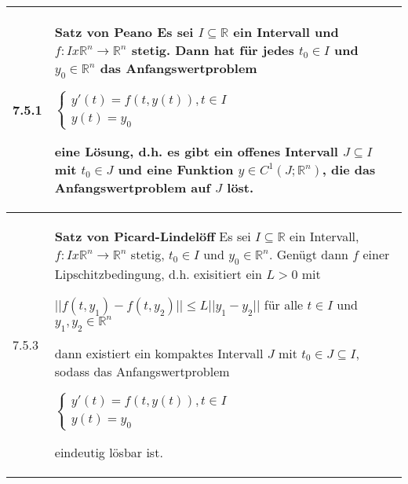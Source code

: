     \begin{longtable}{p{1cm} p{16cm}}
        \toprule

        7.5.1 & \textbf{Satz von Peano} \hfill \break
                Es sei $I \subseteq \mathbb{R}$ ein Intervall und $f: I x \mathbb{R}^n \rightarrow \mathbb{R}^n$ stetig. Dann hat
                für jedes $t_0 \in I$ und $y_0 \in \mathbb{R}^n$ das Anfangswertproblem \hfill \break
                \centerline{$   \begin{cases}
                                y'(t) = f(t,y(t)), t\in I \\
                                y(t) = y_0 
                                \end{cases} $} 
                eine Lösung, d.h. es gibt ein offenes Intervall $J \subseteq I$ mit $t_0 \in J$ und eine Funktion $y \in C^1(J;\mathbb{R}^n)$, 
                die das Anfangswertproblem auf $J$ löst. \\
        \midrule
        7.5.3 & \textbf{Satz von Picard-Lindelöff} \hfill \break
                Es sei $I \subseteq \mathbb{R}$ ein Intervall, $f: I x \mathbb{R}^n \rightarrow \mathbb{R}^n$ stetig, $t_0 \in I$ und 
                $y_0 \in \mathbb{R}^n$. Genügt dann $f$ einer Lipschitzbedingung, d.h. exisitiert ein $L > 0$ mit \hfill \break
                \centerline{$ ||f(t,y_1) -f(t,y_2)|| \leq L||y_1 - y_2||$ für alle $t\in I$ und $y_1,y_2 \in \mathbb{R}^n $}
                dann existiert ein kompaktes Intervall $J$ mit $t_0 \in J \subseteq I$, sodass das Anfangswertproblem \hfill \break
                \centerline{$   \begin{cases}
                                y'(t) = f(t,y(t)), t\in I \\
                                y(t) = y_0 
                                \end{cases} $}
                eindeutig lösbar ist. \\
        \bottomrule
    \end{longtable}
    

